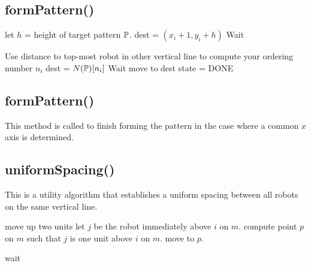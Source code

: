 \documentclass[preprint,10pt]{elsarticle}
\begin{document}
\subsection{formPattern()} 
	\begin{algorithm}[H]
	\begin{algorithmic}[1]

			\State let $h$ = height of target pattern $\mathbb{P}$.
			\State dest = $(x_i + 1, y_i + h)$
		\EndIf
			Wait
		\EndWhile

		\State Use distance to top-most robot in other vertical line to compute your 
		ordering number $n_i$
		\State dest = $N(\mathbb{P})[n_i]$
			Wait
		\EndWhile
		\State move to dest
		state = DONE

	\EndProcedure
	\end{algorithmic}
	\end{algorithm}
\subsection{formPattern()} 
	This method is called to finish forming the pattern in the case where
	a common $x$ axis is determined.
\begin{algorithm}[H]
\begin{algorithmic}[1]
			
		\EndCase
	\EndSwitch
\EndProcedure
\end{algorithmic}
\end{algorithm}

\subsection{uniformSpacing()} 
	This is a utility algorithm that establishes a uniform spacing between all robots on
	the same vertical line.
\begin{algorithm}[H]
\begin{algorithmic}[1]
		\State move up two units
	\EndIf
	\State let $j$ be the robot immediately above $i$ on $m$.
	\State compute point $p$ on $m$ such that $j$ is one
	unit above $i$ on $m$.
	\State move to $p$.

		\State wait
	\EndWhile
\EndProcedure
\end{algorithmic}
\end{algorithm}
\end{document}
